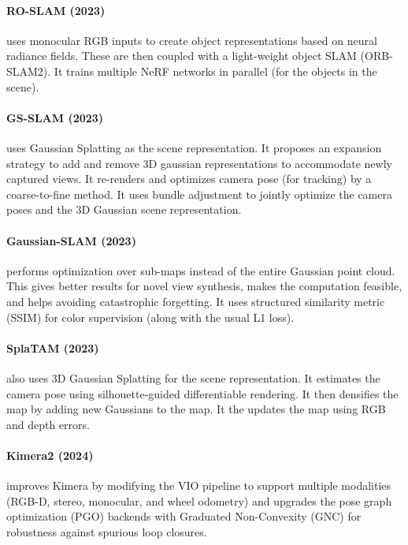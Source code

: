 \paragraph{RO-SLAM (2023) \cite{Han2023ROMAPRM}} uses monocular RGB
inputs to create object representations based on neural radiance
fields. These are then coupled with a light-weight object SLAM
(ORB-SLAM2). It trains multiple NeRF networks in parallel (for the
objects in the scene).

\paragraph{GS-SLAM (2023) \cite{Yan2023GSSLAMDV}} uses Gaussian
Splatting \cite{Kerbl20233DGS} as the scene representation. It
proposes an expansion strategy to add and remove 3D gaussian
representations to accommodate newly captured views. It re-renders and
optimizes camera pose (for tracking) by a coarse-to-fine method. It
uses bundle adjustment to jointly optimize the camera poses and the
3D Gaussian scene representation.

\paragraph{Gaussian-SLAM (2023) \cite{Yugay2023GaussianSLAMPD}} 
performs optimization over sub-maps instead of the entire Gaussian
point cloud. This gives better results for novel view synthesis, makes
the computation feasible, and helps avoiding catastrophic forgetting.
It uses structured similarity metric (SSIM) for color supervision 
(along with the usual L1 loss).

\paragraph{SplaTAM (2023) \cite{Keetha2023SplaTAMST}} also uses 3D
Gaussian Splatting for the scene representation. It estimates the
camera pose using silhouette-guided differentiable rendering. It then
densifies the map by adding new Gaussians to the map. It the updates
the map using RGB and depth errors.

\paragraph{Kimera2 (2024) \cite{Abate2024Kimera2RA}} improves Kimera
by modifying the VIO pipeline to support multiple modalities (RGB-D,
stereo, monocular, and wheel odometry) and upgrades the pose graph
optimization (PGO) backends with Graduated Non-Convexity (GNC)
\cite{Yang2019GraduatedNF} for robustness against spurious loop
closures.

